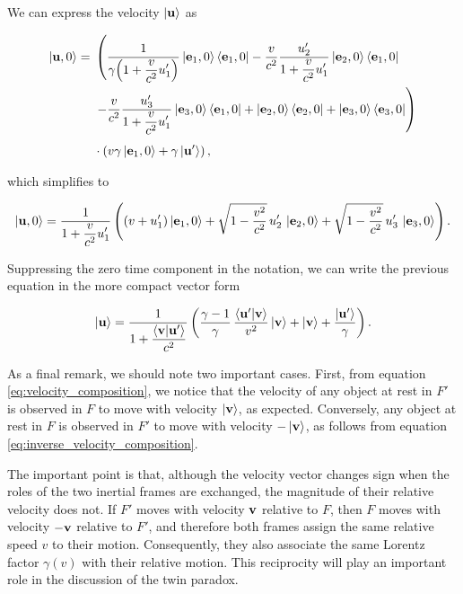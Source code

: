 \documentclass[12pt]{article}
\begin{document}
We can express the velocity $\ket{\vb{u}}$ as

\[
  \begin{aligned}
    \ket{\vb{u},0} =\;
    &\left(
      \frac{1}{
        \displaystyle
        \gamma\!\left(1 + \frac{v}{c^2}u'_1\right)}
        \ket{\vb{e}_1,0}\bra{\vb{e}_1,0}
      - \frac{v}{c^2}
        \frac{u'_2}{
          \displaystyle
          1 + \frac{v}{c^2}u'_1}
        \ket{\vb{e}_2,0}\bra{\vb{e}_1,0}
      \right.
      \\
    &\left.
      - \frac{v}{c^2}
        \frac{u'_3}{
          \displaystyle
          1 + \frac{v}{c^2}u'_1}
        \ket{\vb{e}_3,0}\bra{\vb{e}_1,0}
      + \ket{\vb{e}_2,0}\bra{\vb{e}_2,0}
      + \ket{\vb{e}_3,0}\bra{\vb{e}_3,0}
    \right)
    \\[0.4em]
    &\cdot\left(
      v\gamma\ket{\vb{e}_1,0}
      + \gamma\ket{\vb{u}'}
    \right),
  \end{aligned}
\]

which simplifies to

\[
  \ket{\vb{u},0}
  =
  \frac{1}{
    \displaystyle
    1 + \frac{v}{c^2}u'_1}
  \left(
    (v + u'_1)\ket{\vb{e}_1,0}
    + \sqrt{1 - \frac{v^2}{c^2}}\,
      u'_2\,\ket{\vb{e}_2,0}
    + \sqrt{1 - \frac{v^2}{c^2}}\,
      u'_3\,\ket{\vb{e}_3,0}
  \right).
\]

Suppressing the zero time component in the notation, we can write the previous equation
in the more compact vector form

\begin{equation}
  \ket{\vb{u}}
  =
  \frac{1}{
    \displaystyle
    1 + \frac{\ip{\vb{v}}{\vb{u}'}}{c^2}}
  \left(
    \frac{\gamma - 1}{\gamma}\,
    \frac{\ip{\vb{u}'}{\vb{v}}}{v^2}\ket{\vb{v}}
    + \ket{\vb{v}}
    + \frac{\ket{\vb{u}'}}{\gamma}
  \right).
  \label{eq:velocity_composition}
\end{equation}

As a final remark, we should note two important cases. First, from
equation \eqref{eq:velocity_composition}, we notice that the velocity of any
object at rest in $F'$ is observed in $F$ to move with velocity $\ket{\vb{v}}$,
as expected. Conversely, any object at rest in $F$ is observed in $F'$ to move
with velocity $-\ket{\vb{v}}$, as follows from
equation \eqref{eq:inverse_velocity_composition}.

The important point is that, although the velocity vector changes sign when the roles of
 the two inertial frames are exchanged, the magnitude of their relative velocity does not.
 If $F'$ moves with velocity $\vb{v}$ relative to $F$, then $F$ moves with velocity $-\vb{v}$ relative to $F'$,
  and therefore both frames assign the same relative speed $v$ to their motion. Consequently, they also
  associate the same Lorentz factor $\gamma(v)$ with their relative motion. This reciprocity will play an
  important role in the discussion of the twin paradox.
\end{document}
